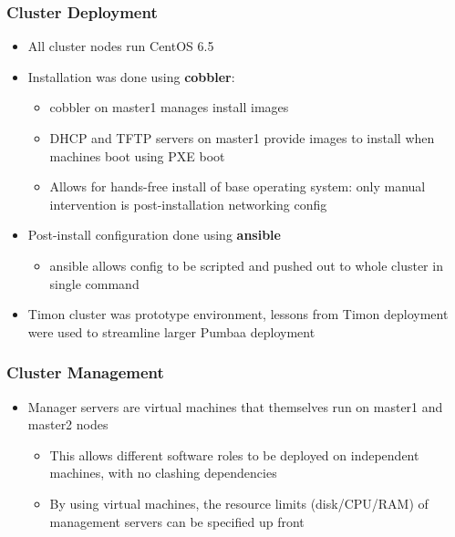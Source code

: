 \documentclass[handout]{beamer}
\begin{document}
\begin{frame}
\frametitle{Cluster Deployment}
\begin{itemize}
\item All cluster nodes run CentOS 6.5
\item Installation was done using \textbf{cobbler}:
\begin{itemize}
\item cobbler on master1 manages install images
\item DHCP and TFTP servers on master1 provide images to install when machines boot using PXE boot
\item Allows for hands-free install of base operating system: only manual intervention is post-installation networking config
\end{itemize}
\item Post-install configuration done using \textbf{ansible}
\begin{itemize}
\item ansible allows config to be scripted and pushed out to whole cluster in single command
\end{itemize}
\item Timon cluster was prototype environment, lessons from Timon deployment were used to streamline larger Pumbaa deployment
\end{itemize}
\end{frame}

\begin{frame}
\frametitle{Cluster Management}
\begin{itemize}
\item Manager servers are virtual machines that themselves run on master1 and master2 nodes
\begin{itemize}
\item This allows different software roles to be deployed on independent machines, with no clashing dependencies
\item By using virtual machines, the resource limits (disk/CPU/RAM) of management servers can be specified up front
\end{itemize}
\end{itemize}
\end{frame}
\end{document}
